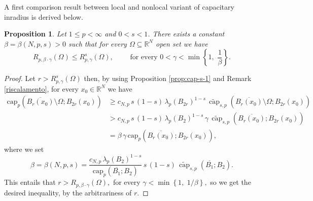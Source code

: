 \documentclass{amsart}
\newtheorem{proposition}[theorem]{Proposition}
\theoremstyle{definition}
\numberwithin{equation}{section}
\begin{document}
A first comparison result between local and nonlocal variant of capacitary inradius is derived below.
\begin{proposition} \label{prop:capin-vs-capin}
	Let $1 \le p < \infty$ and $0 < s< 1$. There exists a constant $\beta = \beta(N,p,s) > 0$ such that for every $\Omega\subseteq\mathbb{R}^N$ open set we have 
	\[
	R_{p, \beta \cdot \gamma}(\Omega)\leq R^s_{p, \gamma}(\Omega), \qquad \mbox{ for every }  0<\gamma<\min\left\{1,\,\, \frac{1}{\beta}\right\}.
	\]
\end{proposition}
\begin{proof}
	Let $r>R^s_{p, \gamma}(\Omega)$ then, by using Proposition \ref{prop:cap-s-1} and Remark \ref{riscalamento}, for every $x_0 \in \mathbb{R}^N$ we have 
	\[
	\begin{split}
		\mathrm{cap}_p\left(\overline{B_r(x_0)}\setminus\Omega; B_{2r}(x_0)\right) &\ge c_{N,p}\, s\,(1-s)\,\lambda_{p}\left(B_{2r}\right)^{1-s}\,\widetilde{\operatorname{cap}}_{s,p}\left(\overline{B_r(x_0)}\setminus\Omega; B_{2r}(x_0)\right) \\
		&>  c_{N,p}\, s\,(1-s)\, \lambda_{p}(B_{2})^{1-s}\,\gamma\,\widetilde{\operatorname{cap}}_{s,p}\left(\overline{B_r(x_0)};B_{2r}(x_0)\right) \\
		&= \beta\,\gamma\,\mathrm{cap}_p\left(\overline{B_r(x_0)}; B_{2r}(x_0)\right),
	\end{split}
	\]
	where we set 
	\[
	\beta = \beta(N,p, s) =\frac{ c_{N,p}\,\lambda_{p}(B_{2})^{1-s}}{\mathrm{cap}_p(\overline{B_1}; B_2)}\,s\,(1-s)\, \widetilde{\operatorname{cap}}_{s,p}(\overline{B_1};B_{2}).
	\]
	This entails that $r > R_{p, \beta\cdot \gamma}(\Omega),$ for every $\gamma < \min\left\{1,\,\, 1/\beta\right\},$ so we get the desired inequality, by the arbitrariness of $r$.
\end{proof}
\end{document}

